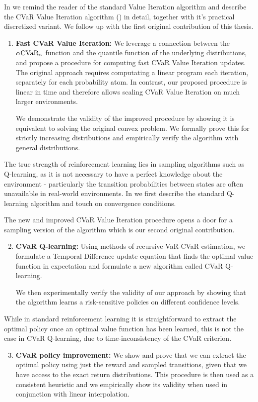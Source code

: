 In  we remind the reader of the standard Value Iteration algorithm and describe the CVaR Value Iteration algorithm (\citet{chow2015risk}) in detail, together with it's practical discretized variant. We follow up with the first original contribution of this thesis.
\begin{enumerate}
\item \textbf{Fast CVaR Value Iteration:} We leverage a connection between the $\alpha\text{CVaR}_\alpha$ function and the quantile function of the underlying distributions, and propose a procedure for computing fast CVaR Value Iteration updates. The original approach requires computating a linear program each iteration, separately for each probability atom. In contrast, our proposed procedure is linear in time and therefore allows scaling CVaR Value Iteration on much larger environments.

We demonstrate the validity of the improved procedure by showing it is equivalent to solving the original convex problem. We formally prove this for strictly increasing distributions and empirically verify the algorithm with general distributions.
\end{enumerate}

The true strength of reinforcement learning lies in sampling algorithms such as Q-learning, as it is not necessary to have a perfect knowledge about the environment - particularly the transition probabilities between states are often unavailable in real-world environments. In  we first describe the standard Q-learning algorithm and touch on convergence conditions. 

The new and improved CVaR Value Iteration procedure opens a door for a sampling version of the algorithm which is our second original contribution.
\begin{enumerate}
\setcounter{enumi}{1}
\item \textbf{CVaR Q-learning:} Using methods of recursive VaR-CVaR estimation, we formulate a Temporal Difference update equation that finds the optimal value function in expectation and formulate a new algorithm called CVaR Q-learning. 

We then experimentally verify the validity of our approach by showing that the algorithm learns a risk-sensitive policies on different confidence levels.
\end{enumerate}

While in standard reinforcement learning it is straightforward to extract the optimal policy once an optimal value function has been learned, this is not the case in CVaR Q-learning, due to time-inconsistency of the CVaR criterion.
\begin{enumerate}
\setcounter{enumi}{2}
\item \textbf{CVaR policy improvement:} We show and prove that we can extract the optimal policy using just the reward and sampled transitions, given that we have access to the exact return distributions. This procedure is then used as a consistent heuristic and we empirically show its validity when used in conjunction with linear interpolation.
\end{enumerate}

